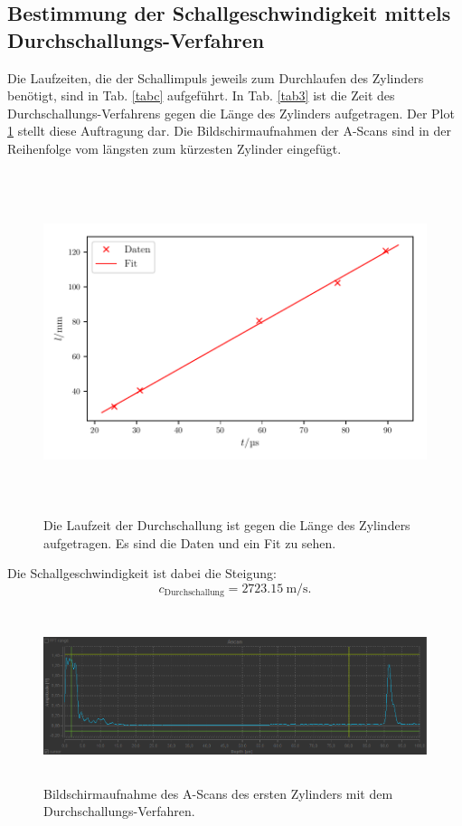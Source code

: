 \subsection{Bestimmung der Schallgeschwindigkeit mittels Durchschallungs-Verfahren}
Die Laufzeiten, die der Schallimpuls jeweils zum Durchlaufen des Zylinders benötigt,
sind in Tab. \ref{tabc} aufgeführt. In Tab. \ref{tab3} ist die Zeit des
Durchschallungs-Verfahrens gegen die Länge des Zylinders aufgetragen.
Der Plot \ref{fig:plot3} stellt diese Auftragung dar.
Die Bildschirmaufnahmen der A-Scans sind in der Reihenfolge vom längsten
zum kürzesten Zylinder eingefügt.


\begin{figure}
    \centering
    \includegraphics[width=15cm, height=10cm]{build/plot3.pdf}
    \caption{Die Laufzeit der Durchschallung ist gegen die Länge des Zylinders
    aufgetragen. Es sind die Daten und ein Fit zu sehen.}
    \label{fig:plot3}
\end{figure}
\noindent Die Schallgeschwindigkeit ist dabei die Steigung:
\begin{equation*}
    c_{\text{Durchschallung}} = \SI{2723.15}{\meter\per\second}.
\end{equation*}

\begin{figure}
    \centering
    \includegraphics[width=15cm, height=5cm]{build/Messung3.1.png}
    \caption{Bildschirmaufnahme des A-Scans des ersten Zylinders mit dem Durchschallungs-Verfahren.}
    \label{fig:m3.1}
\end{figure}

